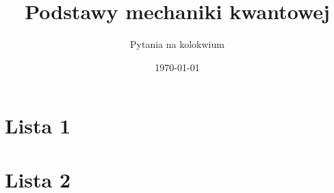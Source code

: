 \documentclass[12pt]{article}
\title{\bfseries Podstawy mechaniki kwantowej}
\author{Pytania na kolokwium}
\date{\today}
\begin{document}
\maketitle

\section*{Lista 1}


\section*{Lista 2}

\end{document}
